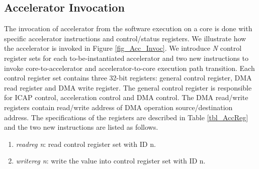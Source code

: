 \subsection{Accelerator Invocation}

The invocation of accelerator from the software execution on a core is
done with specific accelerator instructions and control/status
registers. We illustrate how the accelerator is invoked in Figure
\ref{fig_Acc_Invoc}. We introduce {\em N} control register sets for
each to-be-instantiated accelerator and two new instructions to
invoke core-to-accelerator and accelerator-to-core execution path
transition. Each control register set contains three 32-bit registers:
general control register, DMA read register and DMA write
register. The general control register is responsible for ICAP control,
acceleration control and DMA control. The DMA read/write registers
contain read/write address of DMA operation source/destination
address. The specifications of the registers are described in Table
\ref{tbl_AccReg} and the two new instructions are listed as follows.

\begin{enumerate}
\item{\em readreg n}: read control register set with ID n.
\item{\em writereg n}: write the value into control register set with ID n.
\end{enumerate}

